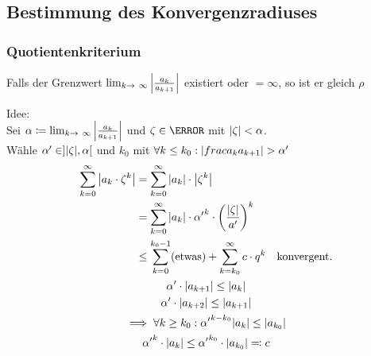 \subsection{Bestimmung des Konvergenzradiuses}
\subsubsection{Quotientenkriterium}
Falls der Grenzwert $\lim_{k \rightarrow \infty} \abs{\frac{a_k}{a_{k+1}}}$ existiert oder $= \infty$, so ist er gleich $\rho$

Idee:\\
Sei $\alpha \coloneqq \lim_{k \rightarrow \infty} \abs{\frac{a_k}{a_{k+1}}}$ und $\zeta \in \C$ mit $\abs{\zeta} < \alpha$.\\
Wähle $\alpha' \in ] \abs{\zeta} , \alpha [$ und $k_0$ mit $\forall k \leq k_0 : \abs{frac{a_k}{a_{k+1}}} > \alpha'$
\begin{gather*}
	\begin{split}
		\sum_{k=0}^\infty \abs{a_k \cdot \zeta^k}	&= \sum_{k=0}^\infty \abs{a_k} \cdot \abs{\zeta^k} \\
										&= \sum_{k=0}^\infty \abs{a_k} \cdot {\alpha'}^k \cdot \left( \frac{\abs{\zeta}}{a'} \right)^k \\
										&\leq \sum_{k=0}^{k_0 - 1} (\text{etwas}) + \sum_{k=k_0}^\infty c \cdot q^k \quad \text{konvergent.} 
	\end{split}\\
	\alpha' \cdot \abs{a_{k+1}} \leq \abs{a_k} \\
	\alpha' \cdot \abs{a_{k+2}} \leq \abs{a_{k+1}} \\
	\implies \forall k \geq k_0 : {\alpha'}^{k-k_0} \abs{a_k} \leq \abs{a_{k_0}} \\
	{\alpha'}^k \cdot \abs{a_k} \leq {\alpha'}^{k_0} \cdot \abs{a_{k_0}} \eqqcolon c
\end{gather*}

